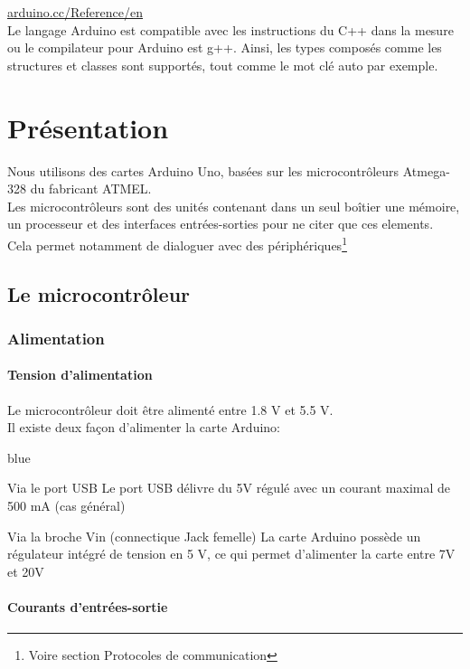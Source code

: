 \underline{arduino.cc/Reference/en} \\

Le langage Arduino est compatible avec les instructions du C++ dans la mesure ou le compilateur pour Arduino est g++.
Ainsi, les types composés comme les structures et classes sont supportés, tout comme le mot clé auto par exemple.


\chapter{Présentation}

Nous utilisons des cartes Arduino Uno, basées sur les microcontrôleurs Atmega-328 du fabricant ATMEL.\\
Les microcontrôleurs sont des unités contenant dans un seul boîtier une mémoire, un processeur et des 
interfaces entrées-sorties pour ne citer que ces elements.
 \\
 Cela permet notamment de dialoguer avec des périphériques\footnote{Voire section Protocoles de communication}

\section{Le microcontrôleur}


\subsection{Alimentation}

\subsubsection{Tension d'alimentation}

Le microcontrôleur doit être alimenté entre 1.8 V et 5.5 V. \\
Il existe deux façon d'alimenter la carte Arduino: 

\begin{items}{blue}{\Triangle}
\item Via le port USB 
Le port USB délivre du 5V régulé avec un courant maximal de 500 mA (cas général)
\item Via la broche Vin (connectique Jack femelle)
La carte Arduino possède un régulateur intégré de tension en 5 V, ce qui permet d'alimenter la carte entre 7V et 20V

\end{items}

\subsubsection{Courants d'entrées-sortie}


